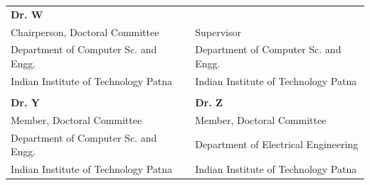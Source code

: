 \begin{table}[h]
\begin{tabular}{lp{2.1 cm}l}
\textbf{Dr. W}  						&   &  	\textbf{\supervisorname}  \\
Chairperson, Doctoral Committee  		&   &  	Supervisor \\
Department of Computer Sc. and Engg. 	&  	& 	Department of Computer Sc. and Engg.\\
Indian Institute of Technology Patna 	&   & 	Indian Institute of Technology Patna \\

\vspace*{1.5cm}\\

\textbf{Dr. Y} 							&  & \textbf{Dr. Z}    \\
Member, Doctoral Committee     			&  & Member, Doctoral Committee         \\
Department of Computer Sc. and Engg. 	&  & Department of Electrical Engineering   \\
Indian Institute of Technology Patna 	&  & Indian Institute of Technology Patna  \\
\end{tabular}
\end{table}

\vspace*{1.5cm} 



